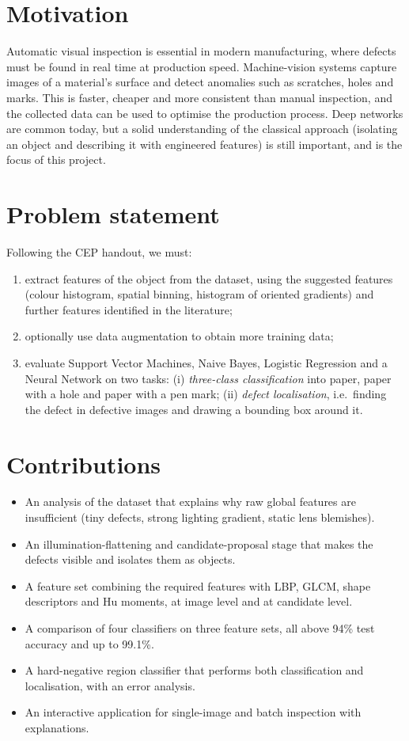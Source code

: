 \documentclass[11pt,a4paper]{report}
\begin{document}
\section{Motivation}
Automatic visual inspection is essential in modern manufacturing, where defects must be
found in real time at production speed. Machine-vision systems capture images of a
material's surface and detect anomalies such as scratches, holes and marks. This is faster,
cheaper and more consistent than manual inspection, and the collected data can be used to
optimise the production process. Deep networks are common today, but a solid understanding
of the classical approach (isolating an object and describing it with engineered features) is
still important, and is the focus of this project.

\section{Problem statement}
Following the CEP handout, we must:
\begin{enumerate}
  \item extract features of the object from the dataset, using the suggested features (colour
        histogram, spatial binning, histogram of oriented gradients) and further features
        identified in the literature;
  \item optionally use data augmentation to obtain more training data;
  \item evaluate Support Vector Machines, Naive Bayes, Logistic Regression and a Neural
        Network on two tasks: (i) \emph{three-class classification} into paper, paper with
        a hole and paper with a pen mark; (ii) \emph{defect localisation}, i.e.\ finding the
        defect in defective images and drawing a bounding box around it.
\end{enumerate}

\section{Contributions}
\begin{itemize}
  \item An analysis of the dataset that explains why raw global features are insufficient
        (tiny defects, strong lighting gradient, static lens blemishes).
  \item An illumination-flattening and candidate-proposal stage that makes the defects
        visible and isolates them as objects.
  \item A feature set combining the required features with LBP, GLCM, shape descriptors and
        Hu moments, at image level and at candidate level.
  \item A comparison of four classifiers on three feature sets, all above 94\% test
        accuracy and up to 99.1\%.
  \item A hard-negative region classifier that performs both classification and
        localisation, with an error analysis.
  \item An interactive application for single-image and batch inspection with
        explanations.
\end{itemize}
\end{document}
